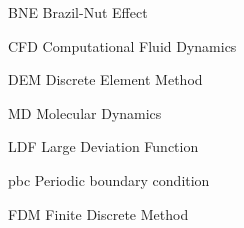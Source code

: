 
\begin{siglas}
    \item[BNE] Brazil-Nut Effect
    \item[CFD] Computational Fluid Dynamics
    \item[DEM] Discrete Element Method
    \item[MD] Molecular Dynamics
    \item[LDF] Large Deviation Function
    \item[pbc] Periodic boundary condition
    \item[FDM] Finite Discrete Method
\end{siglas}

